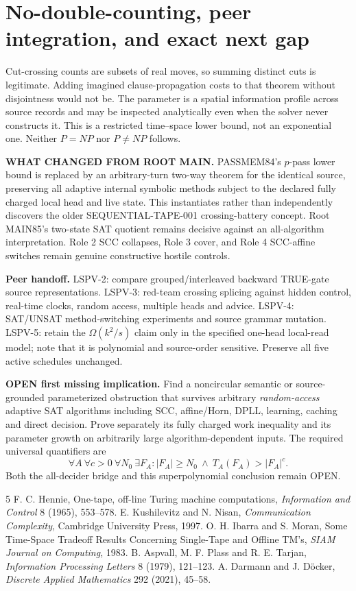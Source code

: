 \documentclass[11pt]{article}
\begin{document}
\section{No-double-counting, peer integration, and exact next gap}
Cut-crossing counts are subsets of real moves, so summing distinct cuts is legitimate. Adding imagined clause-propagation costs to that theorem without disjointness would not be. The parameter is a spatial information profile across source records and may be inspected analytically even when the solver never constructs it. This is a restricted time--space lower bound, not an exponential one. Neither $P=NP$ nor $P\ne NP$ follows.

\noindent\textbf{WHAT CHANGED FROM ROOT MAIN.} PASSMEM84's $p$-pass lower bound is replaced by an arbitrary-turn two-way theorem for the identical source, preserving all adaptive internal symbolic methods subject to the declared fully charged local head and live state. This instantiates rather than independently discovers the older SEQUENTIAL-TAPE-001 crossing-battery concept. Root MAIN85's two-state SAT quotient remains decisive against an all-algorithm interpretation. Role 2 SCC collapses, Role 3 cover, and Role 4 SCC-affine switches remain genuine constructive hostile controls.

\noindent\textbf{Peer handoff.} LSPV-2: compare grouped/interleaved backward TRUE-gate source representations. LSPV-3: red-team crossing splicing against hidden control, real-time clocks, random access, multiple heads and advice. LSPV-4: SAT/UNSAT method-switching experiments and source grammar mutation. LSPV-5: retain the $\Omega(k^2/s)$ claim only in the specified one-head local-read model; note that it is polynomial and source-order sensitive. Preserve all five active schedules unchanged.

\noindent\textbf{OPEN first missing implication.} Find a noncircular semantic or source-grounded parameterized obstruction that survives arbitrary \emph{random-access} adaptive SAT algorithms including SCC, affine/Horn, DPLL, learning, caching and direct decision. Prove separately its fully charged work inequality and its parameter growth on arbitrarily large algorithm-dependent inputs. The required universal quantifiers are
\[
\forall A\ \forall c>0\ \forall N_0\ \exists F_A:
|F_A|\ge N_0\ \land\ T_A(F_A)>|F_A|^c.
\]
Both the all-decider bridge and this superpolynomial conclusion remain OPEN.

\begin{thebibliography}{5}
 F. C. Hennie, One-tape, off-line Turing machine computations, \emph{Information and Control} 8 (1965), 553--578.
 E. Kushilevitz and N. Nisan, \emph{Communication Complexity}, Cambridge University Press, 1997.
 O. H. Ibarra and S. Moran, Some Time-Space Tradeoff Results Concerning Single-Tape and Offline TM's, \emph{SIAM Journal on Computing}, 1983.
 B. Aspvall, M. F. Plass and R. E. Tarjan, \emph{Information Processing Letters} 8 (1979), 121--123.
 A. Darmann and J. D\"ocker, \emph{Discrete Applied Mathematics} 292 (2021), 45--58.
\end{thebibliography}
\end{document}
